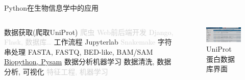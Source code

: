 \begin{frame}{Python在生物信息学中的应用}
    \begin{columns}
        \begin{myoutline}[itemize]
            \1 数据获取(爬取UniProt)
                \2 \textcolor{lightgray}{爬虫}
            \1 \textcolor{lightgray}{Web前后端开发}
                \2 \textcolor{lightgray}{Django, Flask, 数据库\dots}
            \1 工作流程
                \2 Jupyterlab
                \2 \textcolor{lightgray}{Snakemake}
            \1 字符串处理
                \2 FASTA, FASTQ, BED-like, BAM/SAM
                \2 \underline{Biopython, Pysam}
            \1 数据分析机器学习
                \2 数据清洗, 数据分析, 可视化
                \2 \textcolor{lightgray}{特征工程, 机器学习}
        \end{myoutline}
        \begin{figure}
            \centering
            \includegraphics[width=8cm]{Images/uniprot.jpg}
            \caption{UniProt 蛋白数据库界面}
        \end{figure}
    \end{columns}

\end{frame}


